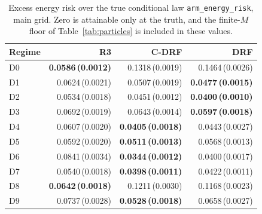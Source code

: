 \begin{table}[htbp]
\centering
\caption{Excess energy risk over the true conditional law \texttt{arm\_energy\_risk}, main grid. Zero is attainable only at the truth, and the finite-$M$ floor of Table~\ref{tab:particles} is included in these values.}
\label{tab:all-energy}
\scriptsize
\setlength{\tabcolsep}{3.2pt}
\begin{tabular}{@{}lrrr@{}}
\toprule
Regime & R3 & C-DRF & DRF \\
\midrule
D0 & \textbf{0.0586\,(0.0012)} & 0.1318\,(0.0019) & 0.1464\,(0.0026) \\
D1 & 0.0624\,(0.0021) & 0.0507\,(0.0019) & \textbf{0.0477\,(0.0015)} \\
D2 & 0.0534\,(0.0018) & 0.0451\,(0.0012) & \textbf{0.0400\,(0.0010)} \\
D3 & 0.0692\,(0.0019) & 0.0643\,(0.0014) & \textbf{0.0597\,(0.0018)} \\
D4 & 0.0607\,(0.0020) & \textbf{0.0405\,(0.0018)} & 0.0443\,(0.0027) \\
D5 & 0.0592\,(0.0020) & \textbf{0.0511\,(0.0013)} & 0.0568\,(0.0013) \\
D6 & 0.0841\,(0.0034) & \textbf{0.0344\,(0.0012)} & 0.0400\,(0.0017) \\
D7 & 0.0540\,(0.0018) & \textbf{0.0398\,(0.0011)} & 0.0422\,(0.0011) \\
D8 & \textbf{0.0642\,(0.0018)} & 0.1211\,(0.0030) & 0.1168\,(0.0023) \\
D9 & 0.0737\,(0.0028) & \textbf{0.0528\,(0.0018)} & 0.0658\,(0.0027) \\
\bottomrule
\end{tabular}
\end{table}


